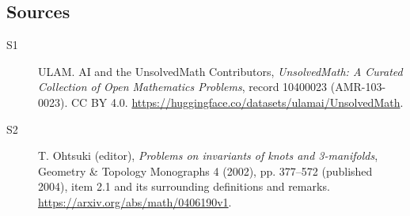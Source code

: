 \documentclass[11pt]{article}
\begin{document}
\subsection{Sources}
\begin{description}
\item[\hypertarget{source:10400023:1}{S1}] ULAM. AI and the UnsolvedMath Contributors, \emph{UnsolvedMath: A Curated Collection of Open Mathematics Problems}, record 10400023 (AMR-103-0023). CC BY 4.0. \url{https://huggingface.co/datasets/ulamai/UnsolvedMath}.
\item[\hypertarget{source:10400023:2}{S2}] T. Ohtsuki (editor), \emph{Problems on invariants of knots and 3-manifolds}, Geometry \& Topology Monographs 4 (2002), pp. 377--572 (published 2004), item 2.1 and its surrounding definitions and remarks. \url{https://arxiv.org/abs/math/0406190v1}.
\end{description}
\label{end:10400023}
\end{document}
